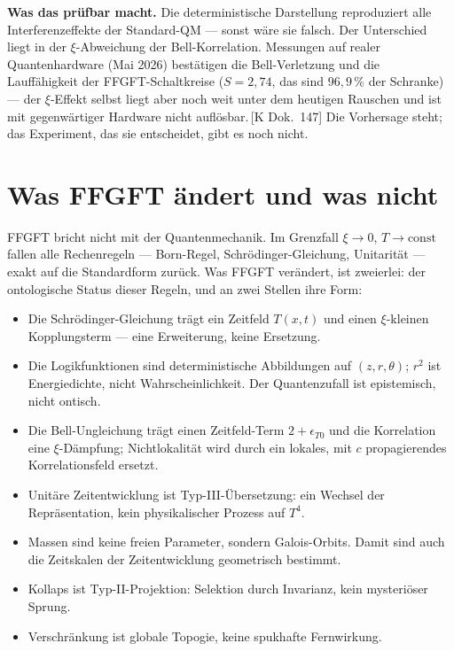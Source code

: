 \documentclass[11pt,oneside]{book}
\newcommand{\status}[1]{\penalty10000\,{\scriptsize\textcolor{gray!60}{[#1]}}}
\begin{document}
\textbf{Was das prüfbar macht.} Die deterministische Darstellung
reproduziert alle Interferenzeffekte der Standard-QM --- sonst wäre sie
falsch. Der Unterschied liegt in der $\xi$-Abweichung der Bell-Korrelation.
Messungen auf realer Quantenhardware (Mai 2026) bestätigen die Bell-Verletzung und die
Lauffähigkeit der FFGFT-Schaltkreise ($S = 2{,}74$, das sind $96{,}9\,\%$
der Schranke) --- der $\xi$-Effekt selbst liegt aber noch weit unter dem
heutigen Rauschen und ist mit gegenwärtiger Hardware nicht
auflösbar.\status{K Dok.~147} Die Vorhersage steht; das Experiment, das
sie entscheidet, gibt es noch nicht.

\section*{Was FFGFT ändert und was nicht}

FFGFT bricht nicht mit der Quantenmechanik. Im Grenzfall $\xi \to 0$,
$T \to \mathrm{const}$ fallen alle Rechenregeln --- Born-Regel,
Schrödinger-Gleichung, Unitarität --- exakt auf die Standardform zurück.
Was FFGFT verändert, ist zweierlei: der ontologische Status dieser Regeln,
und an zwei Stellen ihre Form:

\begin{itemize}
  \item Die Schrödinger-Gleichung trägt ein Zeitfeld $T(x,t)$ und einen
    $\xi$-kleinen Kopplungsterm --- eine Erweiterung, keine Ersetzung.
  \item Die Logikfunktionen sind deterministische Abbildungen auf
    $(z,r,\theta)$; $r^2$ ist Energiedichte, nicht Wahrscheinlichkeit.
    Der Quantenzufall ist epistemisch, nicht ontisch.
  \item Die Bell-Ungleichung trägt einen Zeitfeld-Term $2+\epsilon_{T0}$
    und die Korrelation eine $\xi$-Dämpfung; Nichtlokalität wird durch
    ein lokales, mit $c$ propagierendes Korrelationsfeld ersetzt.
  \item Unitäre Zeitentwicklung ist Typ-III-Übersetzung: ein Wechsel
    der Repräsentation, kein physikalischer Prozess auf $T^4$.
  \item Massen sind keine freien Parameter, sondern Galois-Orbits.
    Damit sind auch die Zeitskalen der Zeitentwicklung geometrisch bestimmt.
  \item Kollaps ist Typ-II-Projektion: Selektion durch Invarianz, kein
    mysteriöser Sprung.
  \item Verschränkung ist globale Topogie, keine spukhafte Fernwirkung.
\end{itemize}
\end{document}

